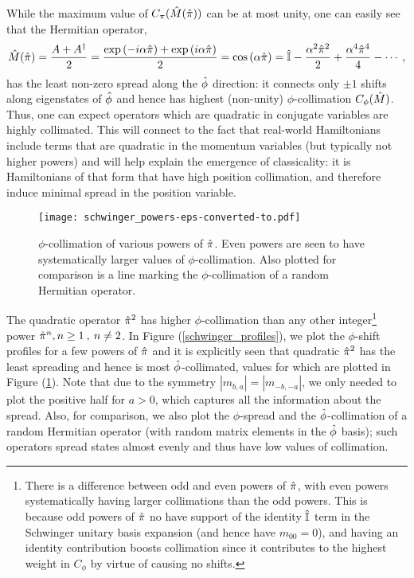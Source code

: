 \documentclass[aps,pra,onecolumn,nofootinbib,11pt,tightenlines]{revtex4-1}
\begin{document}
While the maximum value of $C_{\pi}(\hat{M}(\hat{\pi}))$ can be at most unity, one can easily see that the Hermitian operator,
\begin{equation}
\M(\oppi) = \frac{A + A^{\dag}}{2} = \frac{\exp{\left(- i \alpha \oppi\right)} + \exp{\left(i \alpha \oppi\right)}}{2} = \cos\left( \alpha \oppi \right) = \eye - \frac{\alpha^{2} \oppi^{2}}{2} + \frac{\alpha^{4} \oppi^{4}}{4} - \cdots \: ,
\end{equation}
has the least non-zero spread along the $\hat{\phi}$ direction: it connects only $\pm 1$ shifts along eigenstates of $\hat{\phi}$ and hence has highest (non-unity) $\phi$-collimation $C_{\phi}(\hat{M})$. 
Thus, one can expect operators which are quadratic in conjugate variables are highly collimated. This will connect to the fact that real-world Hamiltonians include terms that are quadratic in the momentum variables (but typically not higher powers) and will help explain the emergence of classicality: it is Hamiltonians of that form that have high position collimation, and therefore induce minimal spread in the position variable. 
\begin{figure}[h]
\texttt{[image: schwinger\_powers-eps-converted-to.pdf]}
\caption{$\phi$-collimation of various powers of $\hat{\pi}$. Even powers are seen to have systematically larger values of $\phi$-collimation. Also plotted for comparison is a line marking the $\phi$-collimation of a random Hermitian operator.}
\label{schwinger_powers}
\end{figure}

The quadratic operator $\hat{\pi}^{2}$ has higher $\phi$-collimation than any other integer\footnote{There is a difference between odd and even powers of $\hat{\pi}$, with even powers systematically having larger collimations than the odd powers. This is because odd powers of $\hat{\pi}$ no have support of the identity $\hat{\mathbb{I}}$ term in the Schwinger unitary basis expansion (and hence have $m_{00} = 0$), and having an identity contribution boosts collimation since it contributes to the highest weight in $C_{\phi}$ by virtue of causing no shifts.} power $\hat{\pi}^{n}, n \geq 1 \: , \: n \neq 2$. In Figure (\ref{schwinger_profiles}), we plot the $\phi$-shift profiles for a few powers of $\hat{\pi}$ and it is explicitly seen that quadratic $\hat{\pi}^{2}$ has the least spreading and hence is most $\hat{\phi}$-collimated, values for which are plotted in Figure (\ref{schwinger_powers}). Note that due to the symmetry $|m_{b,a}| = |m_{-b,-a}|$, we only needed to plot the positive half for $a > 0$, which captures all the information about the spread. Also, for comparison, we also plot the $\phi$-spread and the $\hat{\phi}$-collimation of a {random} Hermitian operator (with random matrix elements in the $\hat{\phi}$ basis); such operators spread states almost evenly and thus have low values of collimation. 
\end{document}
